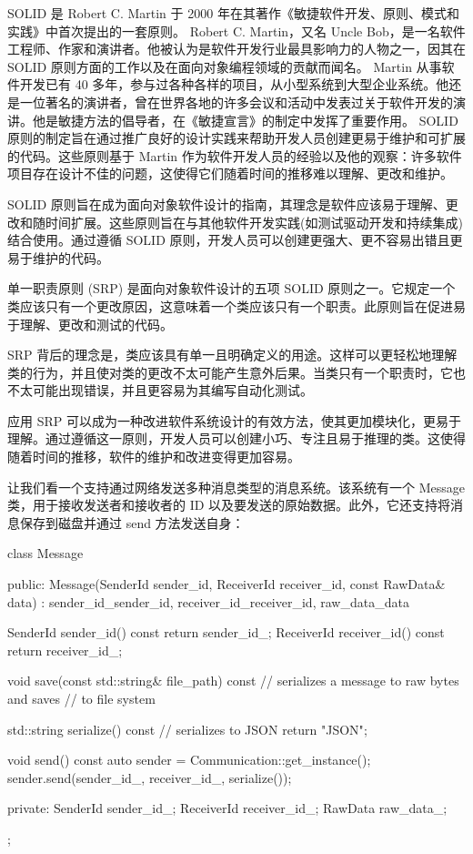 
SOLID 是 Robert C. Martin 于 2000 年在其著作《敏捷软件开发、原则、模式和实践》中首次提出的一套原则。 Robert C. Martin，又名 Uncle Bob，是一名软件工程师、作家和演讲者。他被认为是软件开发行业最具影响力的人物之一，因其在 SOLID 原则方面的工作以及在面向对象编程领域的贡献而闻名。 Martin 从事软件开发已有 40 多年，参与过各种各样的项目，从小型系统到大型企业系统。他还是一位著名的演讲者，曾在世界各地的许多会议和活动中发表过关于软件开发的演讲。他是敏捷方法的倡导者，在《敏捷宣言》的制定中发挥了重要作用。 SOLID 原则的制定旨在通过推广良好的设计实践来帮助开发人员创建更易于维护和可扩展的代码。这些原则基于 Martin 作为软件开发人员的经验以及他的观察：许多软件项目存在设计不佳的问题，这使得它们随着时间的推移难以理解、更改和维护。

SOLID 原则旨在成为面向对象软件设计的指南，其理念是软件应该易于理解、更改和随时间扩展。这些原则旨在与其他软件开发实践(如测试驱动开发和持续集成)结合使用。通过遵循 SOLID 原则，开发人员可以创建更强大、更不容易出错且更易于维护的代码。


单一职责原则 (SRP) 是面向对象软件设计的五项 SOLID 原则之一。它规定一个类应该只有一个更改原因，这意味着一个类应该只有一个职责。此原则旨在促进易于理解、更改和测试的代码。

SRP 背后的理念是，类应该具有单一且明确定义的用途。这样可以更轻松地理解类的行为，并且使对类的更改不太可能产生意外后果。当类只有一个职责时，它也不太可能出现错误，并且更容易为其编写自动化测试。

应用 SRP 可以成为一种改进软件系统设计的有效方法，使其更加模块化，更易于理解。通过遵循这一原则，开发人员可以创建小巧、专注且易于推理的类。这使得随着时间的推移，软件的维护和改进变得更加容易。

让我们看一个支持通过网络发送多种消息类型的消息系统。该系统有一个 Message 类，用于接收发送者和接收者的 ID 以及要发送的原始数据。此外，它还支持将消息保存到磁盘并通过 send 方法发送自身：

\begin{cpp}
class Message {
public:
    Message(SenderId sender_id, ReceiverId receiver_id,
            const RawData& data)
        : sender_id_{sender_id},
          receiver_id_{receiver_id}, raw_data_{data} {}

    SenderId sender_id() const { return sender_id_; }
    ReceiverId receiver_id() const { return receiver_id_; }

    void save(const std::string& file_path) const {
        // serializes a message to raw bytes and saves
        // to file system
    }

    std::string serialize() const {
        // serializes to JSON
        return {"JSON"};
    }

    void send() const {
        auto sender = Communication::get_instance();
        sender.send(sender_id_, receiver_id_, serialize());
    }

private:
    SenderId sender_id_;
    ReceiverId receiver_id_;
    RawData raw_data_;
};
\end{cpp}

